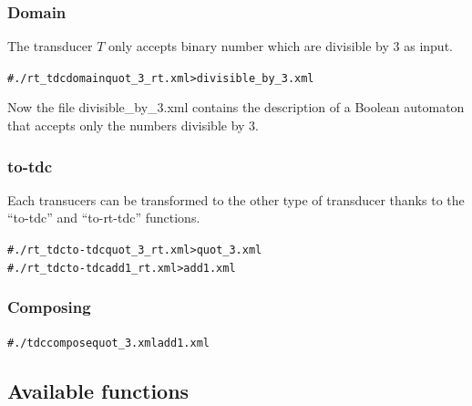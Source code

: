\subsubsection{Domain}
The transducer $T$ only accepts binary number which are divisible by 3
as input.
\begin{alltt}
# ./rt_tdc domain quot_3_rt.xml > divisible_by_3.xml
\end{alltt}
Now the file divisible\_by\_3.xml contains the description of a Boolean
automaton that accepts only the numbers divisible by 3.

\subsubsection{to-tdc}
Each transucers can be transformed to the other type of transducer
thanks to the ``to-tdc'' and ``to-rt-tdc'' functions.
\begin{alltt}
# ./rt_tdc to-tdc quot_3_rt.xml > quot_3.xml
# ./rt_tdc to-tdc add1_rt.xml > add1.xml
\end{alltt}

\subsubsection{Composing}
\begin{alltt}
# ./tdc compose quot_3.xml add1.xml
\end{alltt}

\subsection{Available functions}

